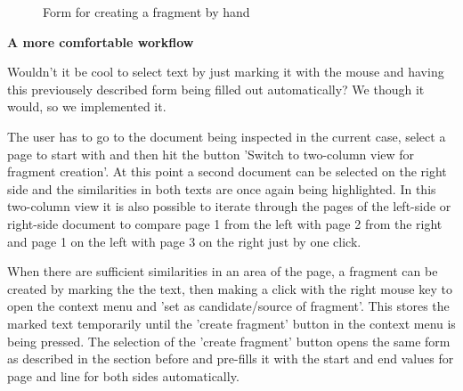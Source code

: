 \begin{figure}[!h]
  \centering
  \caption{Form for creating a fragment by hand}
  \label{fig:fragment-form}
\end{figure}

\textbf{A more comfortable workflow}

Wouldn't it be cool to select text by just marking it with the mouse and having this previousely described form being filled out automatically? We though it would, so we implemented it. 

The user has to go to the document being inspected in the current case, select a page to start with and then hit the button 'Switch to two-column view for fragment creation'. At this point a second document can be selected on the right side and the similarities in both texts are once again being highlighted. In this two-column view it is also possible to iterate through the pages of the left-side or right-side document to compare page 1 from the left with page 2 from the right and page 1 on the left with page 3 on the right just by one click.

When there are sufficient similarities in an area of the page, a fragment can be created by marking the the text, then making a click with the right mouse key to open the context menu and 'set as candidate/source of fragment'. This stores the marked text temporarily until the 'create fragment' button in the context menu is being pressed. The selection of the 'create fragment' button opens the same form as described in the section before and pre-fills it with the start and end values for page and line for both sides automatically.

